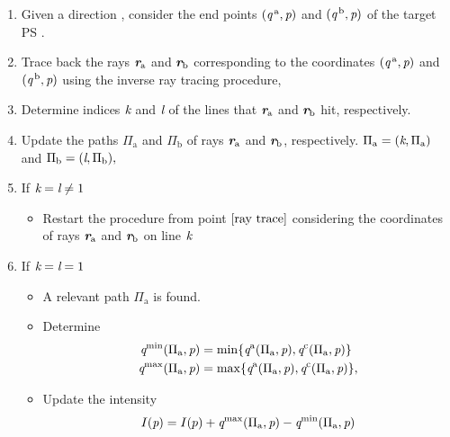 \begin{enumerate}
\item Given a direction , consider the end points $(\textit{q}^{\,\textrm{a}}, \textit{p})$ and $(\textit{q}^{\,\textrm{b}}, \textit{p})$ of the target PS .
\item \label{ray trace} Trace back the rays $\textit{\textbf{r}}_{\textrm{a}}$ and $\textit{\textbf{r}}_\textrm{b}$ corresponding to the coordinates  $(\textit{q}^{\,\textrm{a}}, \textit{p})$ and $ (\textit{q}^{\,\textrm{b}}, \textit{p})$ using the inverse ray tracing procedure,
\item Determine indices $\textit{k}$ and $\textit{l}$ of the lines that  $\textit{\textbf{r}}_{\textrm{a}}$ and $\textit{\textbf{r}}_{\textrm{b}}$  hit, respectively.\\
\item Update the paths $\Pi_\textrm{a}$ and $\Pi_\textrm{b}$ of rays $\textit{\textbf{r}}_\textrm{a}$ and $\textit{\textbf{r}}_\textrm{b}$, respectively.  $\Pi_\textrm{a} = (\textit{k}, \Pi_{\textrm{a}})$ and $\Pi_\textrm{b} = (\textit{l}, \Pi_\textrm{b}),$
\item If $\textit{k}=\textit{l} \neq 1$ 
\begin{itemize}
\item Restart the procedure from point $\ref{ray trace}$ considering the coordinates of rays $\textit{\textbf{r}}_{\textrm{a}}$ and $\textit{\textbf{r}}_{\textrm{b}}$ on line $\textit{k}$ 
\end{itemize}
\item If $\textit{k}=\textit{l}= 1$ 
\begin{itemize}
\item A relevant path $\Pi_{\textrm{a}}$ is found. 
\item Determine 
\begin{equation*}
\begin{aligned}
\textit{q}^{\textrm{min}}(\Pi_{\textrm{a}}, \textit{p})&=\min\{\textit{q}^{\textrm{a}}(\Pi_{\textrm{a}}, \textit{p}), \textit{q}^{\textrm{c}}(\Pi_{\textrm{a}}, \textit{p})\}\\ 
\textit{q}^{\textrm{max}}(\Pi_{\textrm{a}}, \textit{p})&=\max\{\textit{q}^{\textrm{a}}(\Pi_{\textrm{a}}, \textit{p}), \textit{q}^{\textrm{c}}(\Pi_{\textrm{a}}, \textit{p})\},
\end{aligned}
\end{equation*}
\item Update the intensity $$I(\textit{p}) = I(p)+\textit{q}^{\textrm{max}}(\Pi_{\textrm{a}}, \textit{p})-\textit{q}^{\textrm{min}}(\Pi_{\textrm{a}}, \textit{p})$$

\end{itemize}
\end{enumerate}
